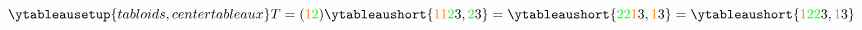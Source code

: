 \documentclass[equation,convert={outext=.svg,command=\unexpanded{pdf2svg \infile\space\outfile}},multi=false, varwidth=true, border={0 0 6cm 0}]{standalone}
\begin{document}
\color{white}
\huge
\boldmath
\begin{equation*}
  \ytableausetup{tabloids, centertableaux}
  T=({\color{orange}1}{\color{green}2}) \ytableaushort{{\color{orange}1}{\color{orange}1}{\color{green}2}3,{\color{green}2}3} = \ytableaushort{{\color{green}2}{\color{green}2}{\color{orange}1}3,{\color{orange}1}3} = \ytableaushort{{\color{orange}1}{\color{green}2}{\color{green}2}3,{\color{orange}1}3}
\end{equation*}
\end{document}

